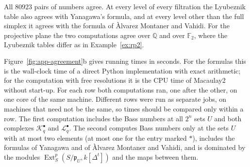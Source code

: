 \documentclass[11pt]{article}
\theoremstyle{plain}
\theoremstyle{definition}
\begin{document}
All $80923$ pairs of numbers agree. At every level of every filtration the Lyubeznik table also agrees with Yanagawa's formula, and at every level other than the full simplex it agrees with the formula of \`Alvarez Montaner and Vahidi. For the projective plane the two computations agree over $\mathbb{Q}$ and over $\mathbb{F}_2$, where the Lyubeznik tables differ as in Example~\ref{ex:rp2}.

Figure~\ref{fig:app-agreement}b gives running times in seconds. For the formulas this is the wall-clock time of a direct Python implementation with exact arithmetic; for the computation with free resolutions it is the CPU time of Macaulay2 without start-up. For each row both computations ran, one after the other, on one core of the same machine. Different rows were run as separate jobs, on machines that need not be the same, so times should be compared only within a row. The first computation includes the Bass numbers at all $2^n$ sets $U$ and both complexes $\mathcal K^\bullet_q$ and $\mathcal L^\bullet_q$. The second computes Bass numbers only at the sets $U$ with at most two elements (at most one for the entry marked $\ast$), includes the formulas of Yanagawa and of \`Alvarez Montaner and Vahidi, and is dominated by the modules $\operatorname{Ext}^p_S(S/\mathfrak{p}_U,k[\Delta^t])$ and the maps between them.

\endgroup
\end{document}
